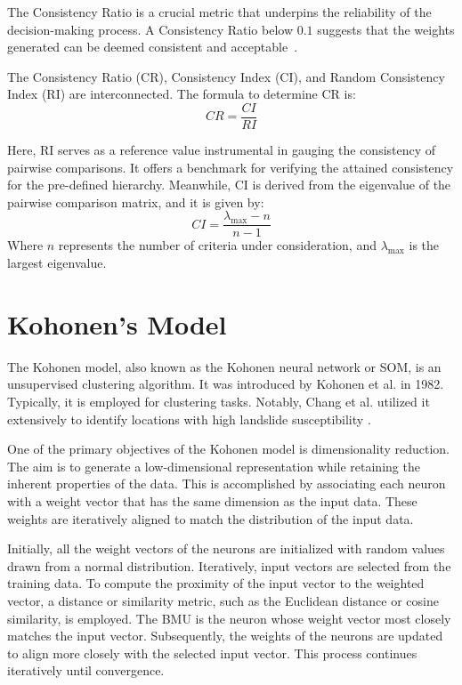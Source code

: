 \documentclass[a4paper,12pt]{Classes/RoboticsLaTeX}
\begin{document}
	The Consistency Ratio is a crucial metric that underpins the reliability of the decision-making process. A Consistency Ratio below \(0.1\) suggests that the weights generated 
	can be deemed consistent and acceptable~\cite{saaty1988}.

	The Consistency Ratio (CR), Consistency Index (CI), and Random Consistency Index (RI) are interconnected. The formula to determine CR is:
	\[ CR = \frac{CI}{RI} \]

	Here, RI serves as a reference value instrumental in gauging the consistency of pairwise comparisons. It offers a benchmark for verifying the attained consistency for the pre-defined hierarchy. Meanwhile, CI is derived from the eigenvalue of the pairwise comparison matrix, and it is given by:
	\[ CI = \frac{\lambda_{\text{max}} - n}{n - 1} \]
	Where \(n\) represents the number of criteria under consideration, and \(\lambda_{\text{max}}\) is the largest eigenvalue.


	\section{Kohonen's Model}

	The Kohonen model, also known as the Kohonen neural network or \ac{SOM}, is an unsupervised clustering algorithm. It was introduced by Kohonen et al. 
	in 1982\cite{kohonen1982}. Typically, it is employed for clustering tasks. Notably, Chang et al. utilized it extensively to identify locations with high landslide susceptibility
	\cite{chang2020}.

	One of the primary objectives of the Kohonen model is dimensionality reduction. The aim is to generate a low-dimensional representation while retaining the inherent 
	properties of the data. This is accomplished by associating each neuron with a weight vector that has the same dimension as the input data. These weights are iteratively 
	aligned to match the distribution of the input data.

	Initially, all the weight vectors of the neurons are initialized with random values drawn from a normal distribution. Iteratively, input vectors are selected from the 
	training data. To compute the proximity of the input vector to the weighted vector, a distance or similarity metric, such as the Euclidean distance or cosine similarity, 
	is employed. The \ac{BMU} is the neuron whose weight vector most closely matches the input vector. Subsequently, the weights of the neurons are updated to 
	align more closely with the selected input vector. This process continues iteratively until convergence.
\end{document}
